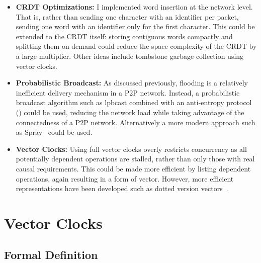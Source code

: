 \documentclass[12pt,a4paper,twoside,openright]{report}
\begin{document}
\begin{itemize}
	\item{\textbf{CRDT Optimizations: } I implemented word insertion at the network level. That is, rather than sending one character with an identifier per packet, sending one word with an identifier only for the first character. This could be extended to the CRDT itself: storing contiguous words compactly and splitting them on demand could reduce the space complexity of the CRDT by a large multiplier. Other ideas include tombstone garbage collection using vector clocks.}
	
	\item{\textbf{Probabilistic Broadcast: } As discussed previously, flooding is a relatively inefficient delivery mechanism in a P2P network. Instead, a probabilistic broadcast algorithm such as lpbcast combined with an anti-entropy protocol (\cite{eugster2003lightweight}) could be used, reducing the network load while taking advantage of the connectedness of a P2P network. Alternatively a more modern approach such as Spray~\cite{nedelec2015spray} could be used.}

	\item{\textbf{Vector Clocks: } Using full vector clocks overly restricts concurrency as all potentially dependent operations are stalled, rather than only those with real causal requirements. This could be made more efficient by listing dependent operations, again resulting in a form of vector. However, more efficient representations have been developed such as dotted version vectors~\cite{preguicca2010dotted}.}

\end{itemize}



\printbibliography

\appendix

\chapter{Vector Clocks}

\section{Formal Definition}
\label{appendix:vectorclocks}
\end{document}
